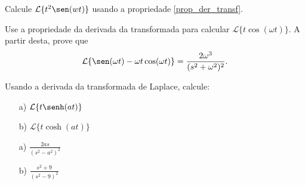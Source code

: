 \begin{exer}Calcule $\mathcal{L}\{t^2\sen(wt)\}$ usando a propriedade \ref{prop_der_transf}.
\end{exer}
\begin{exer}
Use a propriedade da derivada da transformada para calcular $\displaystyle \mathcal{L}\{ t \cos (\omega t) \}$. A partir desta, prove que \begin{equation} \mathcal{L}\{ \sen (\omega t) - \omega t \cos (\omega t) \} = \frac{2 \omega^3 }{(s^2 + \omega^2)^2}. \end{equation}
\end{exer}
\begin{exer}
Usando a derivada da transformada de Laplace, calcule:
\begin{itemize}
  \item[a)] $\displaystyle \mathcal{L} \{ t \senh (at) \}$
  \item[b)] $\displaystyle \mathcal{L} \{ t \cosh (at) \}$
\end{itemize}
\end{exer}
\begin{resp}
 \begin{itemize}
  \item[a)] $\displaystyle \frac{2as}{(s^2 - a^2)^2}$
  \item[b)] $\displaystyle \frac{s^2 + 9}{(s^2 - 9)^2}$
 \end{itemize}
\end{resp}

